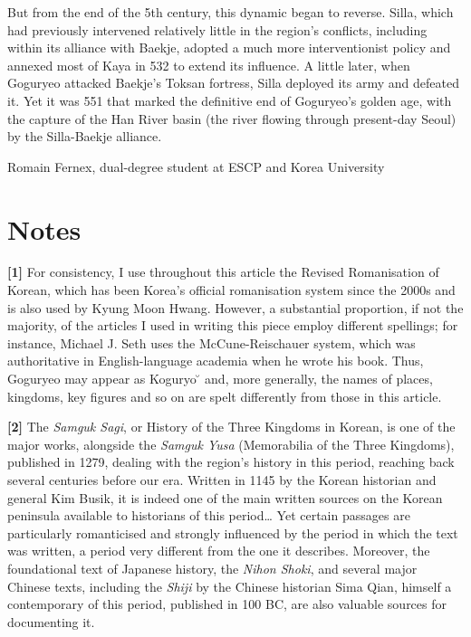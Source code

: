 \documentclass[11pt,a4paper]{article}
\begin{document}
But from the end of the 5th century, this dynamic began to reverse. Silla, which had previously intervened relatively little in the region's conflicts, including within its alliance with Baekje, adopted a much more interventionist policy and annexed most of Kaya in 532 to extend its influence. A little later, when Goguryeo attacked Baekje's Toksan fortress, Silla deployed its army and defeated it. Yet it was 551 that marked the definitive end of Goguryeo's golden age, with the capture of the Han River basin (the river flowing through present-day Seoul) by the Silla-Baekje alliance.

Romain Fernex, dual-degree student at ESCP and Korea University

\section{Notes}

\textbf{{[}1{]}} For consistency, I use throughout this article the Revised Romanisation of Korean, which has been Korea's official romanisation system since the 2000s and is also used by Kyung Moon Hwang. However, a substantial proportion, if not the majority, of the articles I used in writing this piece employ different spellings; for instance, Michael J. Seth uses the McCune-Reischauer system, which was authoritative in English-language academia when he wrote his book. Thus, Goguryeo may appear as Koguryo ̆ and, more generally, the names of places, kingdoms, key figures and so on are spelt differently from those in this article.

\textbf{{[}2{]}} The \emph{Samguk Sagi}, or History of the Three Kingdoms in Korean, is one of the major works, alongside the \emph{Samguk Yusa} (Memorabilia of the Three Kingdoms), published in 1279, dealing with the region's history in this period, reaching back several centuries before our era. Written in 1145 by the Korean historian and general Kim Busik, it is indeed one of the main written sources on the Korean peninsula available to historians of this period\ldots{} Yet certain passages are particularly romanticised and strongly influenced by the period in which the text was written, a period very different from the one it describes. Moreover, the foundational text of Japanese history, the \emph{Nihon Shoki}, and several major Chinese texts, including the \emph{Shiji} by the Chinese historian Sima Qian, himself a contemporary of this period, published in 100 BC, are also valuable sources for documenting it.
\end{document}
